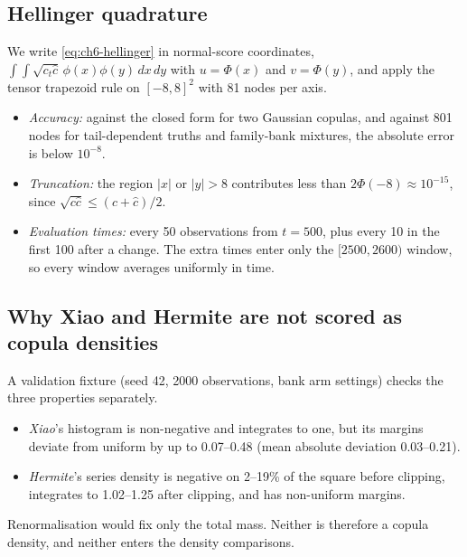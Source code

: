 \subsection{Hellinger quadrature}
We write \eqref{eq:ch6-hellinger} in normal-score coordinates, $\int\!\!\int\sqrt{c_t\widehat c}\,\phi(x)\phi(y)\,dx\,dy$ with $u = \Phi(x)$ and $v = \Phi(y)$, and apply the tensor trapezoid rule on $[-8,8]^2$ with 81 nodes per axis.
\begin{itemize}
  \item \emph{Accuracy:} against the closed form for two Gaussian copulas, and against 801 nodes for tail-dependent truths and family-bank mixtures, the absolute error is below $10^{-8}$.
  \item \emph{Truncation:} the region $|x|$ or $|y| > 8$ contributes less than $2\Phi(-8) \approx 10^{-15}$, since $\sqrt{c\widehat c} \le (c+\widehat c)/2$.
  \item \emph{Evaluation times:} every 50 observations from $t = 500$, plus every 10 in the first 100 after a change. The extra times enter only the $[2500, 2600)$ window, so every window averages uniformly in time.
\end{itemize}

\subsection{Why Xiao and Hermite are not scored as copula densities}
A validation fixture (seed 42, 2000 observations, bank arm settings) checks the three properties separately.
\begin{itemize}
  \item \emph{Xiao}'s histogram is non-negative and integrates to one, but its margins deviate from uniform by up to 0.07--0.48 (mean absolute deviation 0.03--0.21).
  \item \emph{Hermite}'s series density is negative on 2--19\% of the square before clipping, integrates to 1.02--1.25 after clipping, and has non-uniform margins.
\end{itemize}
Renormalisation would fix only the total mass.
Neither is therefore a copula density, and neither enters the density comparisons.

